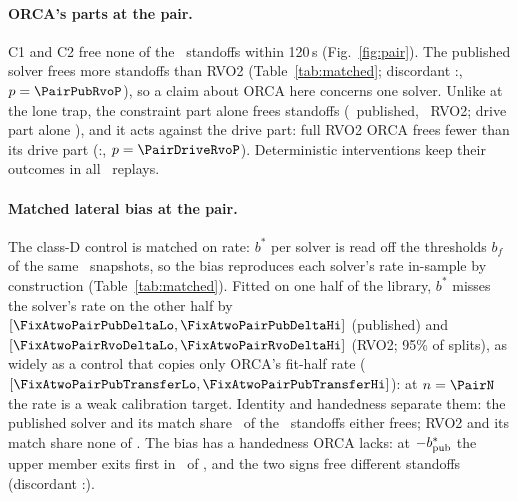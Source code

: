 \paragraph{ORCA's parts at the pair.}
C1 and C2 free none of the \PairN\ standoffs within 120\,s (Fig.~\ref{fig:pair}). The published solver frees more standoffs than RVO2 (Table~\ref{tab:matched}; discordant \PairPubRvoA:\PairPubRvoB, $p=\PairPubRvoP$), so a claim about ORCA here concerns one solver. Unlike at the lone trap, the constraint part alone frees standoffs (\PairConsPubFreed\ published, \PairConsRvoFreed\ RVO2; drive part alone \PairDriveFreed), and it acts against the drive part: full RVO2 ORCA frees fewer than its drive part (\PairDriveRvoA:\PairDriveRvoB, $p=\PairDriveRvoP$). Deterministic interventions keep their outcomes in all \PairReplayN\ replays.

\paragraph{Matched lateral bias at the pair.}
The class-D control is matched on rate: $b^\ast$ per solver is read off the thresholds $b_f$ of the same \PairN\ snapshots, so the bias reproduces each solver's rate in-sample by construction (Table~\ref{tab:matched}). Fitted on one half of the library, $b^\ast$ misses the solver's rate on the other half by $[\FixAtwoPairPubDeltaLo, \FixAtwoPairPubDeltaHi]$ (published) and $[\FixAtwoPairRvoDeltaLo, \FixAtwoPairRvoDeltaHi]$ (RVO2; 95\% of splits), as widely as a control that copies only ORCA's fit-half rate ($[\FixAtwoPairPubTransferLo, \FixAtwoPairPubTransferHi]$): at $n=\PairN$ the rate is a weak calibration target. Identity and handedness separate them: the published solver and its match share \PairBsPubBoth\ of the \PairBsPubEither\ standoffs either frees; RVO2 and its match share none of \PairBsRvoEither. The bias has a handedness ORCA lacks: at $-b^\ast_{\rm pub}$ the upper member exits first in \PairBsPubMinusUpper\ of \PairBsPubMinusFreed, and the two signs free different standoffs (discordant \PairBsPubRevA:\PairBsPubRevB).

